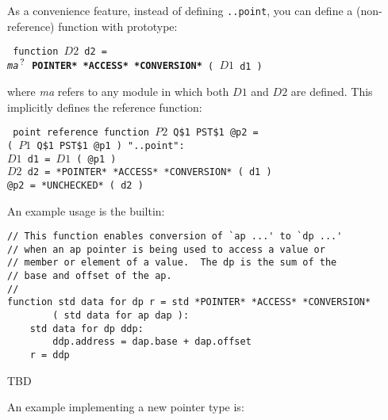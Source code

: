 \documentclass[12pt]{article}
\newcommand{\QMARK}{{$^{\,\mbox{\footnotesize ?}}$}}
\newcommand{\ttkey}[1]{{\tt \bfseries #1}}
\newenvironment{indpar}[1][0.3in]%
	{\begin{list}{}%
		     {\setlength{\itemsep}{0in}%
		      \setlength{\topsep}{0in}%
		      \setlength{\parsep}{1ex}%
		      \setlength{\labelwidth}{#1}%
		      \setlength{\leftmargin}{#1}%
		      \addtolength{\leftmargin}{\labelsep}}%
	 \item}%
	{\end{list}}
\begin{document}
As a convenience feature, instead of defining {\tt ..point}, you
can define a (non-reference) function with prototype:
\begin{indpar} \tt
function $D2$ d2 = \\
\hspace*{4em} {\em ma}\QMARK{} \ttkey{*POINTER* *ACCESS* *CONVERSION*}
		( $D1$ d1 )
\end{indpar}
where {\em ma} refers to any module in which both $D1$ and $D2$ are defined.
This implicitly defines the reference function:
\begin{indpar} \tt
point reference function $P2$ Q\$1 PST\$1 @p2 = \\
\hspace*{1in}( $P1$ Q\$1 PST\$1 @p1 ) "..point": \\
\hspace*{0.3in}$D1$ d1 = $D1$ ( @p1 ) \\
\hspace*{0.3in}$D2$ d2 = *POINTER* *ACCESS* *CONVERSION* ( d1 ) \\
\hspace*{0.3in}@p2 = *UNCHECKED* ( d2 )
\end{indpar}
An example usage is the builtin:
\begin{indpar}\begin{verbatim}
// This function enables conversion of `ap ...' to `dp ...'
// when an ap pointer is being used to access a value or
// member or element of a value.  The dp is the sum of the
// base and offset of the ap.
//
function std data for dp r = std *POINTER* *ACCESS* *CONVERSION*
        ( std data for ap dap ):
    std data for dp ddp:
        ddp.address = dap.base + dap.offset
    r = ddp
\end{verbatim}\end{indpar}

TBD

An example implementing a new pointer type is:
\end{document}
